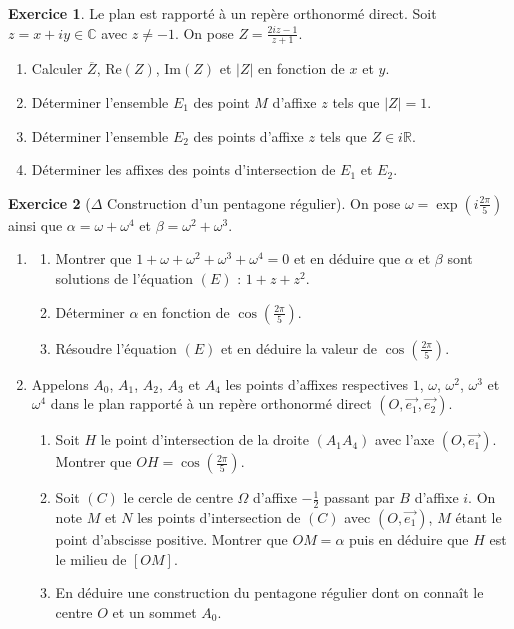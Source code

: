 \documentclass[french]{book}
\newcommand{\R}{\mathbb{R}}
\newcommand{\C}{\mathbb{C}}
\theoremstyle{definition}
\newtheorem{ex}{Exercice}[chapter]
\theoremstyle{theorem}
\theoremstyle{remark}
\begin{document}
\begin{ex}
	Le plan est rapporté à un repère orthonormé direct. Soit $z=x+iy\in\C$ avec $z\ne -1$. On pose $Z=\displaystyle\frac{2iz-1}{z+1}$.
	\begin{enumerate}
		\item Calculer $\overline{Z}$, $\text{Re}(Z)$, $\text{Im}(Z)$ et $\lvert Z\rvert$ en fonction de $x$ et $y$.
		\item Déterminer l'ensemble $E_1$ des point $M$ d'affixe $z$ tels que $\lvert Z\rvert=1$.
		\item Déterminer l'ensemble $E_2$ des points d'affixe $z$ tels que $Z\in i\R$.
		\item Déterminer les affixes des points d'intersection de $E_1$ et $E_2$.
	\end{enumerate}
\end{ex}

\begin{ex}[$\Delta$ Construction d'un pentagone régulier]
	On pose $\omega=\exp\displaystyle\left(i\frac{2\pi}{5}\right)$ ainsi que $\alpha=\omega+\omega^4$ et $\beta=\omega^2+\omega^3$.
	\begin{enumerate}
		\item \begin{enumerate}[label=\alph*.]
			\item Montrer que $1+\omega+\omega^2+\omega^3+\omega^4=0$ et en déduire que $\alpha$ et $\beta$ sont solutions de l'équation $(E)$ : $1+z+z^2$.
			\item Déterminer $\alpha$ en fonction de $\cos\displaystyle\left(\frac{2\pi}{5}\right)$.
			\item Résoudre l'équation $(E)$ et en déduire la valeur de $\cos\left(\frac{2\pi}{5}\right)$.
		\end{enumerate}
		\item Appelons $A_0$, $A_1$, $A_2$, $A_3$ et $A_4$ les points d'affixes respectives $1$, $\omega$, $\omega^2$, $\omega^3$ et $\omega^4$ dans le plan rapporté à un repère orthonormé direct $(O,\overrightarrow{e_1},\overrightarrow{e_2})$.
		\begin{enumerate}[label=\alph*.]
			\item Soit $H$ le point d'intersection de la droite $(A_1A_4)$ avec l'axe $(O,\overrightarrow{e_1})$. Montrer que $OH=\displaystyle\cos\left(\frac{2\pi}{5}\right)$.
			\item Soit $(C)$ le cercle de centre $\Omega$ d'affixe $-\displaystyle\frac{1}{2}$ passant par $B$ d'affixe $i$. On note $M$ et $N$ les points d'intersection de $(C)$ avec $(O,\overrightarrow{e_1})$, $M$ étant le point d'abscisse positive. Montrer que $OM=\alpha$ puis en déduire que $H$ est le milieu de $[OM]$.
			\item En déduire une construction du pentagone régulier dont on connaît le centre $O$ et un sommet $A_0$.
		\end{enumerate}
	\end{enumerate}
\end{ex}
\end{document}
